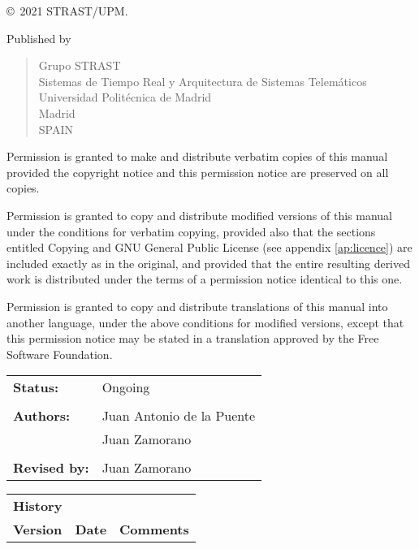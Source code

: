 
{\footnotesize
\noindent
\copyright\ 2021 STRAST/UPM.

\vspace{\baselineskip}\noindent
Published by
\begin{quote}
Grupo STRAST\\
Sistemas de Tiempo Real y Arquitectura de Sistemas Telemáticos\\
Universidad Politécnica de Madrid\\
Madrid\\
SPAIN
\end{quote}

\vspace{\baselineskip}\noindent
Permission is granted to make and distribute verbatim copies of this
manual provided the copyright notice and this permission notice are
preserved on all copies.

Permission is granted to copy and distribute modified versions of this
manual under the conditions for verbatim copying, provided also that
the sections entitled  Copying  and  GNU General Public License  (see
appendix \ref{ap:licence}) are included exactly as in the
original, and provided that the entire resulting derived work is
distributed under the terms of a permission notice identical to this
one.

Permission is granted to copy and distribute translations of this
manual into another language, under the above conditions for modified
versions, except that this permission notice may be stated in a
translation approved by the Free Software Foundation.

\vspace{\baselineskip}
\noindent
\begin{tabular}{lp{120mm}}
\textbf{Status:}  & Ongoing\\
\\
\textbf{Authors:}    & Juan Antonio de la Puente\\
                     & Juan Zamorano\\
\\
\textbf{Revised by:} & Juan Zamorano\\
\end{tabular}

\vspace{2\baselineskip}
\noindent
\begin{tabular}{llp{120mm}}
\textbf{History}\\
\textbf{Version}&\textbf{Date}&\textbf{Comments}\\
\end{tabular}

}






